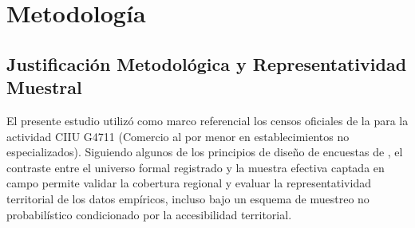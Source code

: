 \documentclass[11pt,a4paper]{article}
\begin{document}
\section{Metodolog\'ia}

\subsection{Justificaci\'on Metodol\'ogica y Representatividad Muestral}
El presente estudio utilizó como marco referencial los censos oficiales de la \citet{camara2025} para la actividad CIIU G4711 (Comercio al por menor en establecimientos no especializados). Siguiendo algunos de los principios de diseño de encuestas de \citet{lohr2021}, el contraste entre el universo formal registrado y la muestra efectiva captada en campo permite validar la cobertura regional y evaluar la representatividad territorial de los datos empíricos, incluso bajo un esquema de muestreo no probabilístico condicionado por la accesibilidad territorial.
\end{document}
